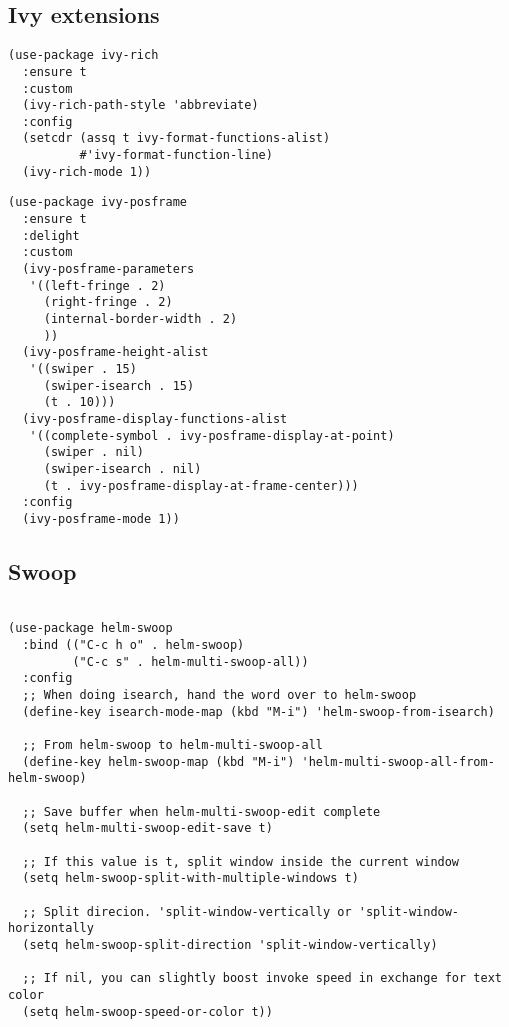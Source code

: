 \documentclass[12pt]{article}
\begin{document}
\subsection{Ivy extensions}
\label{sec:orgd8b5635}

\begin{verbatim}
(use-package ivy-rich
  :ensure t
  :custom
  (ivy-rich-path-style 'abbreviate)
  :config
  (setcdr (assq t ivy-format-functions-alist)
          #'ivy-format-function-line)
  (ivy-rich-mode 1))
\end{verbatim}

\begin{verbatim}
(use-package ivy-posframe
  :ensure t
  :delight
  :custom
  (ivy-posframe-parameters
   '((left-fringe . 2)
     (right-fringe . 2)
     (internal-border-width . 2)
     ))
  (ivy-posframe-height-alist
   '((swiper . 15)
     (swiper-isearch . 15)
     (t . 10)))
  (ivy-posframe-display-functions-alist
   '((complete-symbol . ivy-posframe-display-at-point)
     (swiper . nil)
     (swiper-isearch . nil)
     (t . ivy-posframe-display-at-frame-center)))
  :config
  (ivy-posframe-mode 1))
\end{verbatim}

\subsection{Swoop}
\label{sec:org81417b3}
\begin{verbatim}

(use-package helm-swoop
  :bind (("C-c h o" . helm-swoop)
         ("C-c s" . helm-multi-swoop-all))
  :config
  ;; When doing isearch, hand the word over to helm-swoop
  (define-key isearch-mode-map (kbd "M-i") 'helm-swoop-from-isearch)

  ;; From helm-swoop to helm-multi-swoop-all
  (define-key helm-swoop-map (kbd "M-i") 'helm-multi-swoop-all-from-helm-swoop)

  ;; Save buffer when helm-multi-swoop-edit complete
  (setq helm-multi-swoop-edit-save t)

  ;; If this value is t, split window inside the current window
  (setq helm-swoop-split-with-multiple-windows t)

  ;; Split direcion. 'split-window-vertically or 'split-window-horizontally
  (setq helm-swoop-split-direction 'split-window-vertically)

  ;; If nil, you can slightly boost invoke speed in exchange for text color
  (setq helm-swoop-speed-or-color t))

\end{verbatim}
\end{document}
